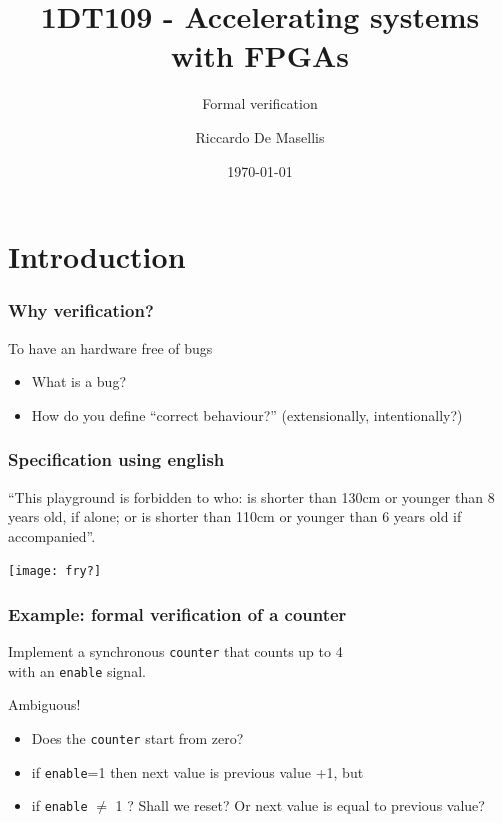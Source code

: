 \documentclass[usenames,dvipsnames]{beamer}
\title{1DT109 - Accelerating systems with FPGAs}
\subtitle{Formal verification}
\author[R.\ De Masellis]{Riccardo De Masellis}
\date[]{\today}
\institute[uu.se]{Uppsala University}
\begin{document}
\begin{frame}[plain]
  \titlepage
\end{frame}
\section{Introduction}
\begin{frame}
\frametitle{Why verification?}

\begin{ntblock}
\centering
To have an hardware free of bugs
\end{ntblock}

\vfill \pause 

\begin{itemize}
  \item What is a bug?
  \item \pause How do you define ``correct behaviour?'' \newline (extensionally, intentionally?)
\end{itemize}

  \end{frame}
 

\begin{frame}
  \frametitle{Specification using english}
  
  \begin{center}
  ``This playground is forbidden to who: is shorter than 130cm or younger than 8 years old, if alone; \pause or is shorter than 110cm or younger than 6 years old if accompanied''.	


\vfill \pause

\texttt{[image: fry?]}
\end{center}
\end{frame}



\begin{frame}
  \frametitle{Example: formal verification of a counter}
  
  \begin{ntblock}
  \centering
  Implement a synchronous \texttt{counter} that counts up to 4 \\ with an \texttt{enable} signal.
  \end{ntblock}
  
  \pause \vfill
  
  Ambiguous!
  \begin{itemize}
  \item Does the \texttt{counter} start from zero?
  \item if \texttt{enable}=1 then next value is previous value +1, but
  \item if \texttt{enable} $\not=$ 1 ? Shall we reset? Or next value is equal to previous value?
  \end{itemize}
\end{frame}
\end{document}
